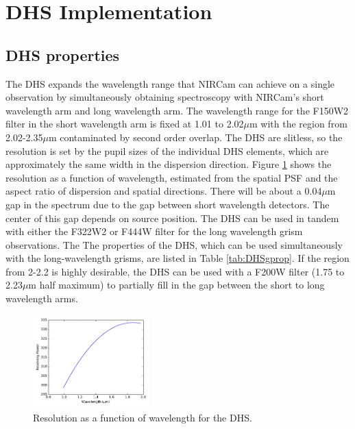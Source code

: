 \documentclass[iop]{emulateapj}
\begin{document}
\section{DHS Implementation}\label{sec:implementation}

\subsection{DHS properties}
The DHS expands the wavelength range that NIRCam can achieve on a single observation by simultaneously obtaining spectroscopy with NIRCam's short wavelength arm and long wavelength arm.
The wavelength range for the F150W2 filter in the short wavelength arm is fixed at 1.01 to 2.02$\mu$m with the region from 2.02-2.35$\mu$m contaminated by second order overlap.
The DHS are slitless, so the resolution is set by the pupil sizes of the individual DHS elements, which are approximately the same width in the dispersion direction.
Figure \ref{fig:DHSRes} shows the resolution as a function of wavelength, estimated from the spatial PSF and the aspect ratio of dispersion and spatial directions.
There will be about a 0.04$\mu$m gap in the spectrum due to the gap between short wavelength detectors.
The center of this gap depends on source position.
The DHS can be used in tandem with either the F322W2 or F444W filter for the long wavelength grism observations.
The The properties of the DHS, which can be used simultaneously with the long-wavelength grisms, are listed in Table \ref{tab:DHSgprop}.
If the region from 2-2.2 is highly desirable, the DHS can be used with a F200W filter (1.75 to 2.23$\mu$m half maximum) to partially fill in the gap between the short to long wavelength arms.

\begin{figure}[!ht]
\centering
\includegraphics[width=0.4\textwidth]{dhs_res.pdf}
\caption{Resolution as a function of wavelength for the DHS.}\label{fig:DHSRes}
\end{figure}
\end{document}
